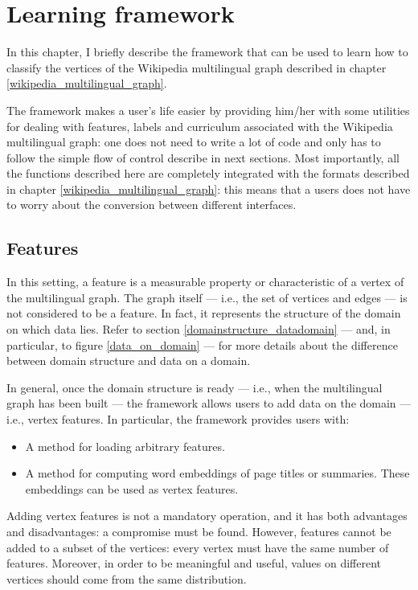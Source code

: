 \chapter{Learning framework}\label{learning_framework}
    In this chapter, I briefly describe the framework that can be used to learn how to classify the vertices of the Wikipedia multilingual graph described in chapter \ref{wikipedia_multilingual_graph}.
    
    The framework makes a user's life easier by providing him/her with some utilities for dealing with features, labels and curriculum associated with the Wikipedia multilingual graph: one does not need to write a lot of code and only has to follow the simple flow of control describe in next sections. Most importantly, all the functions described here are completely integrated with the formats described in chapter \ref{wikipedia_multilingual_graph}: this means that a users does not have to worry about the conversion between different interfaces.
    \section{Features}\label{features}
        In this setting, a feature is a measurable property or characteristic of a vertex of the multilingual graph. The graph itself --- i.e., the set of vertices and edges --- is not considered to be a feature. In fact, it represents the structure of the domain on which data lies. Refer to section \ref{domainstructure_datadomain} --- and, in particular, to figure \ref{data_on_domain} --- for more details about the difference between domain structure and data on a domain.
        
        In general, once the domain structure is ready --- i.e., when the multilingual graph has been built --- the framework allows users to add data on the domain --- i.e., vertex features. In particular, the framework provides users with:
        \begin{itemize}
            \item A method for loading arbitrary features.
            \item A method for computing word embeddings of page titles or summaries. These embeddings can be used as vertex features.
        \end{itemize}
        Adding vertex features is not a mandatory operation, and it has both advantages and disadvantages: a compromise must be found. However, features cannot be added to a subset of the vertices: every vertex must have the same number of features. Moreover, in order to be meaningful and useful, values on different vertices should come from the same distribution.
